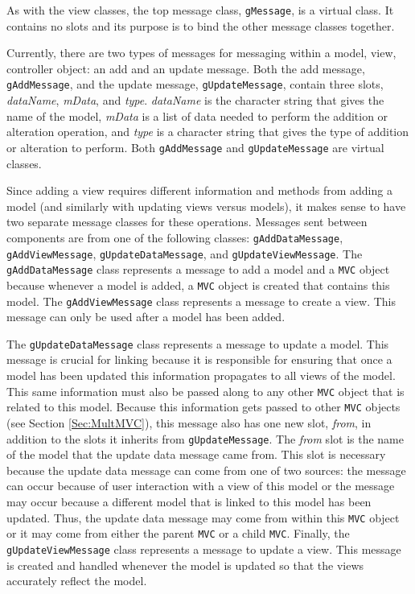 \documentclass{article}[11pt]
\newcommand{\Robject}[1]{{\texttt{#1}}}
\newcommand{\Rslot}[1]{\textsl{#1}}
\newcommand{\Rclass}[1]{\texttt{#1}}
\begin{document}
As with the view classes, the top message class,
\Rclass{gMessage}, is a virtual class.  It contains no slots and its purpose
is to bind the other message classes together.

Currently, there are two types of messages for messaging within a
model, view, controller object: an add and an update message.  Both the add
message, \Rclass{gAddMessage}, and the update message, \Rclass{gUpdateMessage},
contain three slots, \Rslot{dataName}, \Rslot{mData}, and \Rslot{type}.
\Rslot{dataName} is the character string that gives the name of the model,
\Rslot{mData} is a list of data needed to perform the addition or alteration
operation, and \Rslot{type} is a character string that gives the type of
addition or alteration to perform.  Both \Rclass{gAddMessage} and
\Rclass{gUpdateMessage} are virtual classes. 

Since adding a view requires different information and methods from adding a
model (and similarly with updating views versus models), it makes sense to
have two separate message classes for these operations.  Messages
sent between components are from one of the following classes:
\Rclass{gAddDataMessage}, \Rclass{gAddViewMessage},
\Rclass{gUpdateDataMessage}, and \Rclass{gUpdateViewMessage}.  The
\Rclass{gAddDataMessage} class represents a message to add a model
and a \Robject{MVC} object because whenever a model is added, a
\Robject{MVC} object is created that contains this model.  The
\Rclass{gAddViewMessage} class represents a message to create a view.  This
message can only be used after a model has been added. 

The \Rclass{gUpdateDataMessage} class represents a message to update
a model.  This message is crucial for linking because it is
responsible for ensuring that once a model has been updated this
information propagates to all views of the model.  This
same information must also be passed along to any other \Robject{MVC} object
that is related to this model.  Because this
information gets passed to other \Robject{MVC} objects (see Section
\ref{Sec:MultMVC}), this message also has one new slot, \Rslot{from}, in
addition to the slots it inherits from \Rclass{gUpdateMessage}.  The
\Rslot{from} slot is the name of the model that the update data
message came from.  This slot is necessary because the update data message can
come from one of two sources: the message can occur because of user
interaction with a view of this model or the message may
occur because a different model that is
linked to this model has been updated.  Thus, the update data
message may come from within this \Robject{MVC} object or it may come from
either the parent \Robject{MVC} or a child \Robject{MVC}.  Finally, the
\Rclass{gUpdateViewMessage} class represents a message to update a
view.  This message is created and handled whenever the
model is updated so that the views accurately reflect the model. 
\end{document}
